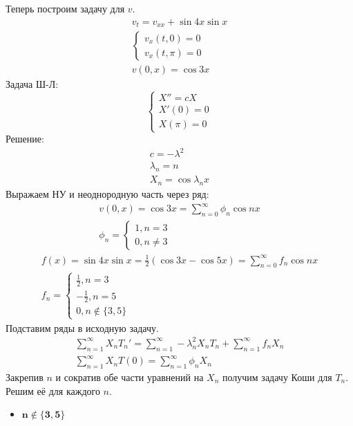 \documentclass[11pt]{article}
\newenvironment{me}{
  \begin{equation}
    \begin{gathered}
      }{
    \end{gathered}
  \end{equation}
}
\newenvironment{ce}{
  \begin{equation}
    \begin{cases}
      }{
    \end{cases}
  \end{equation}
}
\begin{document}
\begin{sloppypar}
  Теперь построим задачу для $v$.
  \begin{me}
    v_t = v_{xx} + \sin{4x} \sin{x} \\
    \begin{cases}
      v_x(t, 0) = 0 \\
      v_x(t, \pi) = 0
    \end{cases} \\
    v(0, x) = \cos{3x}
  \end{me}
  Задача Ш-Л:
  \begin{ce}
    X'' = cX \\
    X'(0) = 0 \\
    X(\pi) = 0
  \end{ce}
  Решение:
  \begin{me}
    c = - \lambda^2 \\
    \lambda_n = n \\
    X_n = \cos{\lambda_n x}
  \end{me}
  Выражаем НУ и неоднородную часть через ряд:
  \begin{me}
    v(0, x) = \cos{3x} = \sum_{n = 0}^\infty \phi_n \cos{nx} \\
    \phi_n = \begin{cases}
      1, n = 3 \\
      0, n \neq 3
    \end{cases}
  \end{me}
  \begin{me}
    f(x) = \sin{4x} \sin{x} = \frac{1}{2}(\cos{3x} - \cos{5x}) = \sum_{n = 0}^\infty f_n \cos{nx} \\
    f_n = \begin{cases}
      \frac{1}{2}, n = 3 \\
      - \frac{1}{2}, n = 5 \\
      0, n \notin \{3, 5\}
    \end{cases}
  \end{me}
  Подставим ряды в исходную задачу.
  \begin{me}
    \sum_{n = 1}^\infty X_n T_n' = \sum_{n = 1}^\infty - \lambda_n^2 X_n T_n + \sum_{n = 1}^\infty f_n X_n \\
    \sum_{n = 1}^\infty X_n T(0) = \sum_{n = 1}^\infty \phi_n X_n
  \end{me}
  Закрепив $n$ и сократив обе части уравнений на $X_n$ получим задачу Коши для $T_n$. Решим её для каждого $n$.
  \begin{itemize}
    \item $\mathbf{n \notin \{3, 5\}}$
      \begin{equation}

\end{equation}
\end{itemize}
\end{sloppypar}
\end{document}
